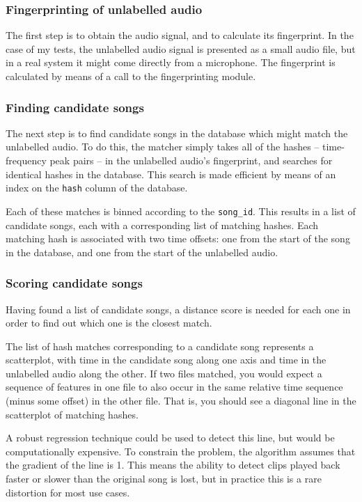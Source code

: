 \documentclass[12pt,a4paper,twoside,openright]{report}
\begin{document}
\subsubsection{Fingerprinting of unlabelled audio}

The first step is to obtain the audio signal, and to calculate its fingerprint. In the case of my tests, the unlabelled audio signal is presented as a small audio file, but in a real system it might come directly from a microphone. The fingerprint is calculated by means of a call to the fingerprinting module.

\subsubsection{Finding candidate songs}

The next step is to find candidate songs in the database which might match the unlabelled audio. To do this, the matcher simply takes all of the hashes -- time-frequency peak pairs -- in the unlabelled audio's fingerprint, and searches for identical hashes in the database. This search is made efficient by means of an index on the \lstinline{hash} column of the database.

Each of these matches is binned according to the \lstinline{song_id}. This results in a list of candidate songs, each with a corresponding list of matching hashes. Each matching hash is associated with two time offsets: one  from the start of the song in the database, and one from the start of the unlabelled audio.

\subsubsection{Scoring candidate songs}

Having found a list of candidate songs, a distance score is needed for each one in order to find out which one is the closest match.

The list of hash matches corresponding to a candidate song represents a scatterplot, with time in the candidate song along one axis and time in the unlabelled audio along the other. If two files matched, you would expect a sequence of features in one file to also occur in the same relative time sequence (minus some offset) in the other file. That is, you should see a diagonal line in the scatterplot of matching hashes.

A robust regression technique could be used to detect this line, but would be computationally expensive. To constrain the problem, the algorithm assumes that the gradient of the line is 1. This means the ability to detect clips played back faster or slower than the original song is lost, but in practice this is a rare distortion for most use cases.
\end{document}
